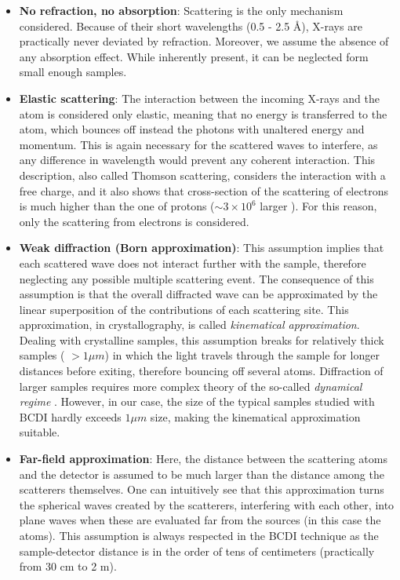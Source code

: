 \begin{itemize}
    \item \textbf{No refraction, no absorption}: Scattering is the only mechanism considered. Because of their short wavelengths
    (0.5 - 2.5 \AA), X-rays are practically never deviated by refraction. Moreover, we assume the absence of any absorption effect. 
    While inherently present, it can be neglected form small enough samples. 
    \item \textbf{Elastic scattering}: The interaction between the incoming X-rays and the atom is considered only elastic, meaning that 
    no energy is transferred to the atom, which bounces off instead the photons with unaltered energy and 
    momentum. This is again necessary for the scattered waves to interfere, as any difference in wavelength would 
    prevent any coherent interaction. This description, also called Thomson scattering, considers the interaction with a free charge, 
    and it also shows that cross-section of the scattering of electrons is much higher than the one of protons ($\sim 3\times10^{6}$ larger ). 
    For this reason, only the scattering from electrons is considered. 
    \item \textbf{Weak diffraction (Born approximation)}: This assumption implies that each scattered wave does not interact 
    further with the sample, therefore neglecting any possible multiple scattering event. The consequence of this assumption 
    is that the overall diffracted wave can be approximated by the linear superposition of the contributions of each scattering site. 
    This approximation, in crystallography, is called \textit{kinematical approximation}. 
    Dealing with crystalline samples, this assumption breaks for relatively thick samples ( $ > 1 \mu m $) in which the 
    light travels through the sample for longer distances before exiting, therefore bouncing off several atoms. 
    Diffraction of larger samples requires more complex theory of the so-called \textit{dynamical regime} \cite{takagi1969dynamical, gorobtsov2016phase, Shabalin2017}.
    However, in our case, the size of the typical samples studied with BCDI hardly exceeds $ 1 \mu m $ size, making the 
    kinematical approximation suitable. 
    \item \textbf{Far-field approximation}: Here, the distance between the scattering atoms and the detector is assumed 
    to be much larger than the distance among the scatterers themselves. One can intuitively see that this approximation 
    turns the spherical waves created by the scatterers, interfering with each other, into plane waves when these are evaluated 
    far from the sources (in this case the atoms). This assumption is always respected in the BCDI 
    technique as the sample-detector distance is in the order of tens of centimeters (practically from 30 cm to 2 m).


\end{itemize}
